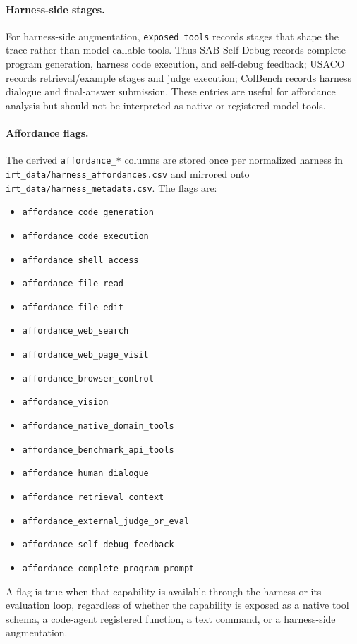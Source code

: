 \paragraph{Harness-side stages.}
For harness-side augmentation, \texttt{exposed\_tools} records stages that
shape the trace rather than model-callable tools. Thus SAB Self-Debug records
complete-program generation, harness code execution, and self-debug feedback;
USACO records retrieval/example stages and judge execution; ColBench records
harness dialogue and final-answer submission. These entries are useful for
affordance analysis but should not be interpreted as native or registered model
tools.

\paragraph{Affordance flags.}
The derived \texttt{affordance\_*} columns are stored once per normalized
harness in \texttt{irt\_data/harness\_affordances.csv} and mirrored onto
\texttt{irt\_data/harness\_metadata.csv}. The flags are:
\begin{itemize}
\item \texttt{affordance\_code\_generation}
\item \texttt{affordance\_code\_execution}
\item \texttt{affordance\_shell\_access}
\item \texttt{affordance\_file\_read}
\item \texttt{affordance\_file\_edit}
\item \texttt{affordance\_web\_search}
\item \texttt{affordance\_web\_page\_visit}
\item \texttt{affordance\_browser\_control}
\item \texttt{affordance\_vision}
\item \texttt{affordance\_native\_domain\_tools}
\item \texttt{affordance\_benchmark\_api\_tools}
\item \texttt{affordance\_human\_dialogue}
\item \texttt{affordance\_retrieval\_context}
\item \texttt{affordance\_external\_judge\_or\_eval}
\item \texttt{affordance\_self\_debug\_feedback}
\item \texttt{affordance\_complete\_program\_prompt}
\end{itemize}
A flag is true when that capability is available through the harness or its
evaluation loop, regardless of whether the capability is exposed as a native
tool schema, a code-agent registered function, a text command, or a
harness-side augmentation.

